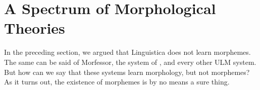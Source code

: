 \section{A Spectrum of Morphological Theories}
\label{sec:morpho-theories}
In the preceding section, we argued that Linguistica does not learn morphemes. The same can be said of Morfessor, 
the system of \cite{poon-et-al:2009}, and %
every other \ac{ULM}  system. 
 But how can we say that these systems learn morphology, but not morphemes? As it turns out,
 the existence of morphemes is by no means a sure thing.  

